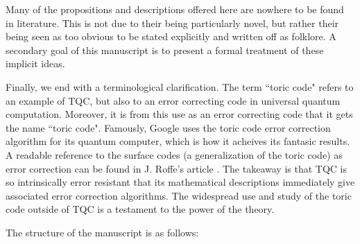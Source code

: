 \documentclass{article}
\theoremstyle{definition}
\numberwithin{figure}{section}
\begin{document}
Many of the propositions and descriptions offered here are nowhere to be found in literature. This is not due to their being particularly novel, but rather their being seen as too obvious to be stated explicitly and written off as folklore. A secondary goal of this manuscript is to present a formal treatment of these implicit ideas.

Finally, we end with a terminological clarification. The term ``toric code" refers to an example of TQC, but also to an error correcting code in universal quantum computation. Moreover, it is from this use as an error correcting code that it gets the name ``toric code". Famously, Google uses the toric code error correction algorithm for its quantum computer, which is how it acheives its fantasic results. A readable reference to the surface codes (a generalization of the toric code) as error correction can be found in J. Roffe's article \cite{roffe2019quantum}. The takeaway is that TQC is so intrinsically error resistant that its mathematical descriptions immediately give associated error correction algorithms. The widespread use and study of the toric code outside of TQC is a testament to the power of the theory.


The structure of the manuscript is as follows:
\end{document}
